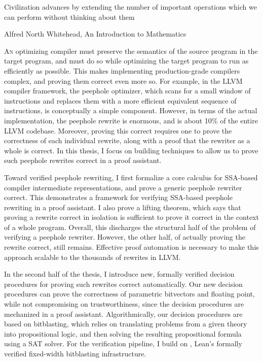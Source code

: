 \epigraph{Civilization advances by extending the number of important operations which we can perform without thinking about them}{Alfred North Whitehead, An Introduction to Mathematics}

\lettrine{A}n optimizing compiler must preserve the semantics of the source program in the target program,
and must do so while optimizing the target program to run as efficiently as possible.
This makes implementing production-grade compilers complex, and proving them correct even more so.
For example, in the LLVM compiler framework, the peephole optimizer,
which scans for a small window of instructions and replaces them with a more efficient equivalent sequence of instructions,
is conceptually a simple component.
However, in terms of the actual implementation, the peephole rewrite is enormous,
and is about 10\% of the entire LLVM codebase.
Moreover, proving this correct requires one to prove the correctness of each individual rewrite,
along with a proof that the rewriter as a whole is correct.
In this thesis, I focus on building techniques to allow us to prove such peephole rewrites correct in a proof assistant.

Toward verified peephole rewriting, I first formalize a core calculus for SSA-based compiler intermediate representations,
and prove a generic peephole rewriter correct.
This demonstrates a framework for verifying SSA-based peephole rewriting in a proof assistant.
I also prove a lifting theorem,
which says that proving a rewrite correct in isolation is sufficient to prove it correct in the context of a whole program.
Overall, this discharges the structural half of the problem of verifying a peephole rewriter.
However, the other half, of actually proving the rewrite correct, still remains.
Effective proof automation is necessary to make this approach scalable to the thousands of rewrites in LLVM.

In the second half of the thesis, I introduce new, formally verified decision procedures for proving such rewrites correct automatically.
Our new decision procedures can prove the correctness of parametric bitvectors and floating point,
while not compromising on trustworthiness, since the decision procedures are mechanized in a proof assistant.
Algorithmically, our decision procedures are based on bitblasting,
which relies on translating problems from a given theory into propositional logic,
and then solving the resulting propositional formula using a SAT solver.
For the verification pipeline, I build on \bvdecide{}, Lean's formally verified fixed-width bitblasting infrastructure.

